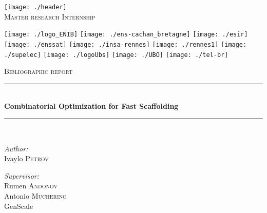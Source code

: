 \documentclass[11pt]{article}
\newcommand{\HRule}{\rule{\linewidth}{0.5mm}}
\begin{document}
\begin{titlepage}

\begin{center}


 

\texttt{[image: ./header]}\\[1cm]
\textsc{\Large Master research Internship}
\vspace{1cm}

\texttt{[image: ./logo\_ENIB]} 
\texttt{[image: ./ens-cachan\_bretagne]}
\texttt{[image: ./esir]}
\texttt{[image: ./enssat]} 
\texttt{[image: ./insa-rennes]}
\texttt{[image: ./rennes1]}
\texttt{[image: ./supelec]}
\texttt{[image: ./logoUbs]}
\texttt{[image: ./UBO]}
\texttt{[image: ./tel-br]}


  
\vspace{1cm} 
\textsc{\Large Bibliographic report }\\[0.5cm]


\HRule \\[0.4cm]
{ \Large \bfseries Combinatorial Optimization for Fast Scaffolding }\\[0.4cm]

\HRule \\[1.5cm]

\begin{minipage}{0.4\textwidth}
\begin{flushleft} \large
\emph{Author:}\\
Ivaylo  \textsc{Petrov}
\end{flushleft}
\end{minipage}
\begin{minipage}{0.4\textwidth}
\begin{flushright} \large
\emph{Supervisor:} \\
%
Rumen \textsc{Andonov} \\
Antonio \textsc{Mucherino} \\
GenScale
\end{flushright}
\end{minipage}

\vfill



\end{center}
\end{titlepage}
\end{document}
